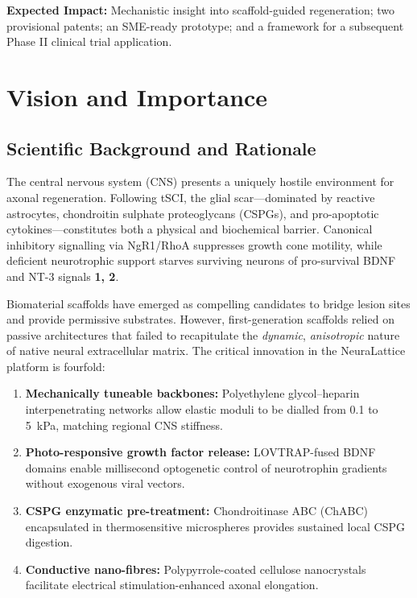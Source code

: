 \documentclass[11pt,a4paper]{article}
\newcommand{\fieldlabel}[1]{\textcolor{ukriblue}{\textbf{#1}}}
\begin{document}
\medskip
\noindent\fieldlabel{Expected Impact:} Mechanistic insight into scaffold-guided regeneration;
two provisional patents; an SME-ready prototype; and a framework for a subsequent Phase II
clinical trial application.

\section{Vision and Importance}

\subsection{Scientific Background and Rationale}

The central nervous system (CNS) presents a uniquely hostile environment for axonal
regeneration. Following tSCI, the glial scar---dominated by reactive astrocytes,
chondroitin sulphate proteoglycans (CSPGs), and pro-apoptotic cytokines---constitutes
both a physical and biochemical barrier. Canonical inhibitory signalling via NgR1/RhoA
suppresses growth cone motility, while deficient neurotrophic support starves surviving
neurons of pro-survival BDNF and NT-3 signals \textbf{\lbrack{}1, 2\rbrack}.

Biomaterial scaffolds have emerged as compelling candidates to bridge lesion sites and
provide permissive substrates. However, first-generation scaffolds relied on passive
architectures that failed to recapitulate the \emph{dynamic}, \emph{anisotropic} nature
of native neural extracellular matrix. The critical innovation in the NeuraLattice platform
is fourfold:

\begin{enumerate}
  \item \textbf{Mechanically tuneable backbones:} Polyethylene glycol--heparin
    interpenetrating networks allow elastic moduli to be dialled from 0.1 to 5~kPa,
    matching regional CNS stiffness.
  \item \textbf{Photo-responsive growth factor release:} LOVTRAP-fused BDNF domains
    enable millisecond optogenetic control of neurotrophin gradients without exogenous
    viral vectors.
  \item \textbf{CSPG enzymatic pre-treatment:} Chondroitinase ABC (ChABC) encapsulated
    in thermosensitive microspheres provides sustained local CSPG digestion.
  \item \textbf{Conductive nano-fibres:} Polypyrrole-coated cellulose nanocrystals
    facilitate electrical stimulation-enhanced axonal elongation.
\end{enumerate}
\end{document}
